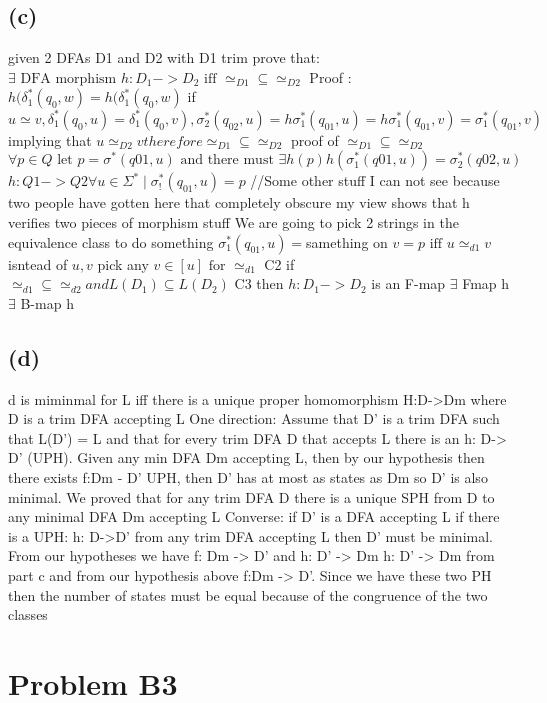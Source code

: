 \documentclass[12pt]{article}
\begin{document}
\subsection*{(c)}
given 2 DFAs D1 and D2 with D1 trim prove that:
 $\exists \text{ DFA morphism } h:D_1 -> D_2 \text{ iff }
 \simeq_{D1} \subseteq \simeq_{D2}$
Proof :  $h(\delta^{*}_1(q_0, w) = h(\delta^{*}_1(q_0, w)$
if $u \simeq v , \delta^{*}_1(q_0, u) = \delta^{*}_1(q_0, v),
\sigma^{*}_2(q_{02}, u) = h\sigma^{*}_1(q_{01}, u) = h\sigma^{*}_1(q_{01}, v)
= \sigma^{*}_1(q_{01}, v)$ implying that
$u \simeq_{D2} v therefore \simeq_{D1} \subseteq \simeq_{D2}$
proof of $\simeq_{D1} \subseteq \simeq_{D2}$
$\forall p \in Q \text{ let } p = \sigma^*(q01, u) \text{ and there must }
\exists h(p) h(\sigma_1^*(q01, u)) = \sigma_2^*(q02, u)$
$h: Q1 -> Q2 \forall u \in \Sigma^*\mid \sigma^*_!(q_{01}, u) = p$
//Some other stuff I can not see because two people
have gotten here that completely obscure my view
shows that h verifies two pieces of morphism stuff
We are going to pick 2 strings in the equivalence class to do something
$\sigma^*_1(q_{01},u) = $samething on $v = p \text{ iff } u \simeq_{d1} v$
isntead of $u,v$ pick any $v \in [u] \text{ for } \simeq_{d1}$
C2 if $\simeq_{d1} \subseteq \simeq_{d2} and L(D_1) \subseteq L(D_2)$
C3 then $h: D_1 -> D_2$ is an F-map
$\exists$ Fmap h 
$\exists$ B-map h

\subsection*{(d)}
d is miminmal for L iff there is a unique proper homomorphism
H:D->Dm where D is a trim DFA accepting L
	One direction:
		Assume that D' is a trim DFA such that L(D') = L and
		that for every trim DFA D that accepts L there is an h: D-> D' (UPH).
		Given any min DFA Dm accepting L, then by our hypothesis then there
		exists f:Dm - D' UPH, then D' has at most as states as Dm so D' is also
		minimal.
	We proved that for any trim DFA D there is a unique SPH from D to any
	minimal DFA Dm accepting L
Converse: if D' is a DFA accepting L if there is a UPH: h: D->D' from any trim
DFA accepting L then D' must be minimal.
	From our hypotheses we have f: Dm -> D' and h: D' -> Dm
	h: D' -> Dm from part c and from our hypothesis above f:Dm -> D'.
	Since we have these two PH then the number of states must be equal because
	of the congruence of the two classes

\section*{Problem B3}
\end{document}
